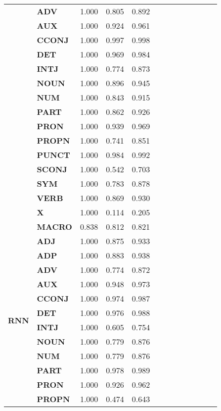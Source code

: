 \begin{longtable}{|l||l||l||l||l||l||l||l||l||l||l||l||l|}
\textbf{} & \textbf{ADV} & 1.000 & 0.805 & 0.892 \\
\textbf{} & \textbf{AUX} & 1.000 & 0.924 & 0.961 \\
\textbf{} & \textbf{CCONJ} & 1.000 & 0.997 & 0.998 \\
\textbf{} & \textbf{DET} & 1.000 & 0.969 & 0.984 \\
\textbf{} & \textbf{INTJ} & 1.000 & 0.774 & 0.873 \\
\textbf{} & \textbf{NOUN} & 1.000 & 0.896 & 0.945 \\
\textbf{} & \textbf{NUM} & 1.000 & 0.843 & 0.915 \\
\textbf{} & \textbf{PART} & 1.000 & 0.862 & 0.926 \\
\textbf{} & \textbf{PRON} & 1.000 & 0.939 & 0.969 \\
\textbf{} & \textbf{PROPN} & 1.000 & 0.741 & 0.851 \\
\textbf{} & \textbf{PUNCT} & 1.000 & 0.984 & 0.992 \\
\textbf{} & \textbf{SCONJ} & 1.000 & 0.542 & 0.703 \\
\textbf{} & \textbf{SYM} & 1.000 & 0.783 & 0.878 \\
\textbf{} & \textbf{VERB} & 1.000 & 0.869 & 0.930 \\
\textbf{} & \textbf{X} & 1.000 & 0.114 & 0.205 \\
\textbf{} & \textbf{MACRO} & 0.838 & 0.812 & 0.821 \\
\cline{1-5}
\multirow[t]{18}{*}{\textbf{RNN}} & \textbf{ADJ} & 1.000 & 0.875 & 0.933 \\
\textbf{} & \textbf{ADP} & 1.000 & 0.883 & 0.938 \\
\textbf{} & \textbf{ADV} & 1.000 & 0.774 & 0.872 \\
\textbf{} & \textbf{AUX} & 1.000 & 0.948 & 0.973 \\
\textbf{} & \textbf{CCONJ} & 1.000 & 0.974 & 0.987 \\
\textbf{} & \textbf{DET} & 1.000 & 0.976 & 0.988 \\
\textbf{} & \textbf{INTJ} & 1.000 & 0.605 & 0.754 \\
\textbf{} & \textbf{NOUN} & 1.000 & 0.779 & 0.876 \\
\textbf{} & \textbf{NUM} & 1.000 & 0.779 & 0.876 \\
\textbf{} & \textbf{PART} & 1.000 & 0.978 & 0.989 \\
\textbf{} & \textbf{PRON} & 1.000 & 0.926 & 0.962 \\
\textbf{} & \textbf{PROPN} & 1.000 & 0.474 & 0.643 \\

\end{longtable}
